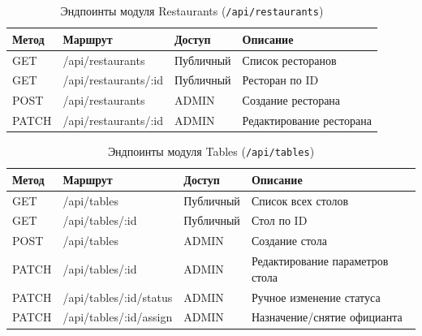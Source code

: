 \begin{table}[H]
\centering
\caption{Эндпоинты модуля Restaurants (\texttt{/api/restaurants})}
\label{tab:api_restaurants}
\begin{tabular}{|p{1.4cm}|p{5.8cm}|p{2.6cm}|p{4.8cm}|}
\hline
\textbf{Метод} & \textbf{Маршрут} & \textbf{Доступ} &
\textbf{Описание} \\
\hline
GET   & /api/restaurants     & Публичный &
  Список ресторанов \\ \hline
GET   & /api/restaurants/:id & Публичный &
  Ресторан по ID \\ \hline
POST  & /api/restaurants     & ADMIN &
  Создание ресторана \\ \hline
PATCH & /api/restaurants/:id & ADMIN &
  Редактирование ресторана \\ \hline
\end{tabular}
\end{table}

\begin{table}[H]
\centering
\caption{Эндпоинты модуля Tables (\texttt{/api/tables})}
\label{tab:api_tables}
\begin{tabular}{|p{1.4cm}|p{5.8cm}|p{2.6cm}|p{4.8cm}|}
\hline
\textbf{Метод} & \textbf{Маршрут} & \textbf{Доступ} &
\textbf{Описание} \\
\hline
GET   & /api/tables                & Публичный &
  Список всех столов \\ \hline
GET   & /api/tables/:id            & Публичный &
  Стол по ID \\ \hline
POST  & /api/tables                & ADMIN &
  Создание стола \\ \hline
PATCH & /api/tables/:id            & ADMIN &
  Редактирование параметров стола \\ \hline
PATCH & /api/tables/:id/status     & ADMIN &
  Ручное изменение статуса \\ \hline
PATCH & /api/tables/:id/assign     & ADMIN &
  Назначение/снятие официанта \\ \hline
\end{tabular}
\end{table}

